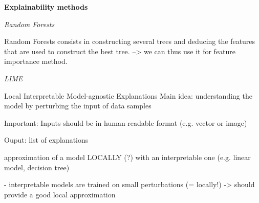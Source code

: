 \textbf{Explainability methods}

\textit{Random Forests}

Random Forests consists in constructing several trees and deducing the features that are used to construct the best tree. --> we can thus use it for feature importance method.

\textit{LIME}

Local Interpretable Model-agnostic Explanations
Main idea: understanding the model by perturbing the input of data samples

Important: Inputs should be in human-readable format (e.g. vector or image)

Ouput: list of explanations

approximation of a model LOCALLY (?) with an interpretable one (e.g. linear model, decision tree)

- interpretable models are trained on small perturbations (= locally!) -> should provide a good local approximation

